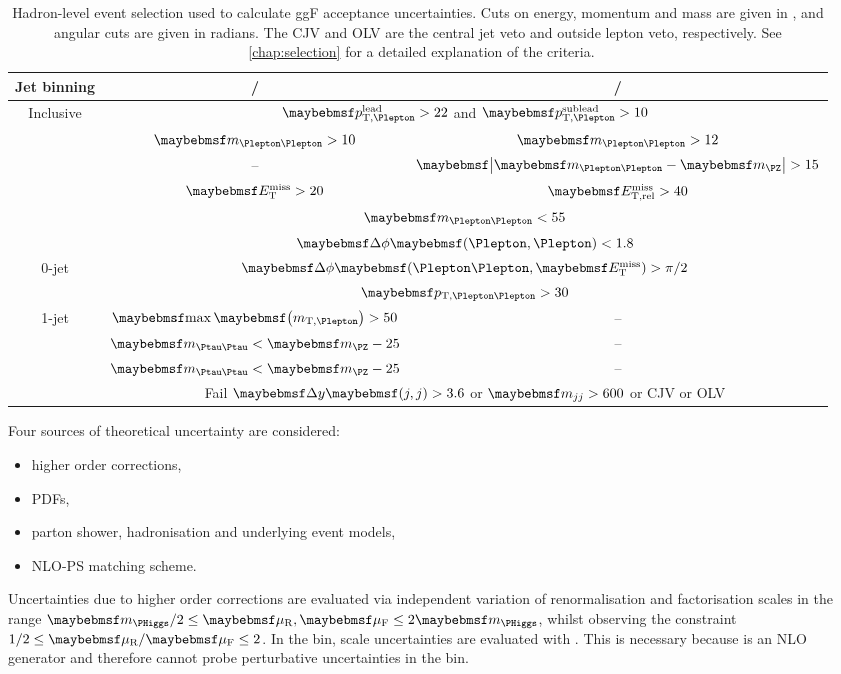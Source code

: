 \begin{table}
	\begin{tabular}{ccc}
		\toprule
		Jet binning & \emch/\mech & \eech/\mmch \\
		\midrule
		Inclusive & \multicolumn{2}{c}{$\ptleadlep > 22$ and $\ptsubleadlep > 10$} \\
		& $\mll > 10$ & $\mll > 12$ \\
		& -- & $\mods{\mll - \mZ} > 15$ \\
		& $\met > 20$ & $\metrel > 40$ \\
		& \multicolumn{2}{c}{$\mll < 55$} \\
		& \multicolumn{2}{c}{$\dphill < 1.8$} \\
		\midrule
		0-jet & \multicolumn{2}{c}{$\dphillmet > \pi/2$} \\
		& \multicolumn{2}{c}{$\ptll > 30$} \\
		\midrule
		1-jet & $\maxmtw > 50$ & -- \\
		& $\mtautau < \mZ - 25$ & -- \\
		\midrule
		\twojet & $\mtautau < \mZ - 25$ & -- \\
		& \multicolumn{2}{c}{Fail $\dyjj > 3.6$ or $\mjj > 600$ or CJV or OLV} \\
		\bottomrule
	\end{tabular}
	\caption{Hadron-level event selection used to calculate ggF acceptance uncertainties. 
	Cuts on energy, momentum and mass are given in \GeV, and angular cuts are given in 
	radians. The CJV and OLV are the central jet veto and outside lepton veto, 
	respectively. See \Chapter~\ref{chap:selection} for a detailed explanation of the 
	criteria.}
	\label{tab:signal:acc_truthselection}
\end{table}

Four sources of theoretical uncertainty are considered:
\begin{itemize}[noitemsep,nolistsep]
	\item higher order corrections,
	\item \acp{PDF},
	\item parton shower, hadronisation and underlying event models,
	\item NLO-PS matching scheme.
\end{itemize}

Uncertainties due to higher order corrections are evaluated via independent variation of 
renormalisation and factorisation scales in the range $\mH/2 \leq \mur,\muf \leq 2\mH$, 
whilst observing the constraint $1/2 \leq \mur/\muf \leq 2$. In the \twojet bin, scale 
uncertainties are evaluated  with \mcfm 
\cite{MCFM:H2j}. This is necessary because \powhegbox is an NLO generator and therefore 
cannot probe perturbative uncertainties in the \twojet bin.

